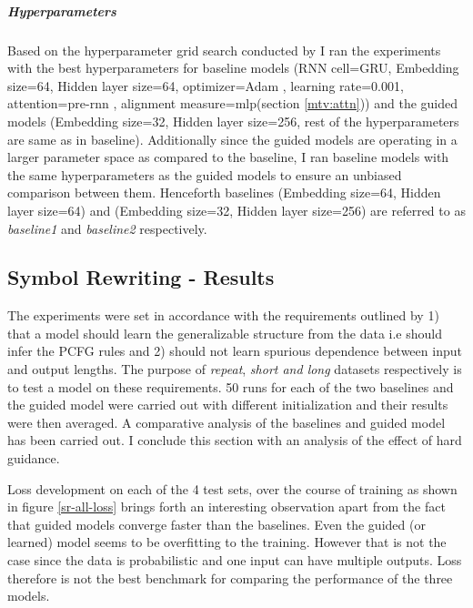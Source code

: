 \subparagraph{Hyperparameters} Based on the hyperparameter grid search conducted by \cite{Hupkes2018} I ran the experiments with the best hyperparameters for baseline models (RNN cell=GRU, Embedding size=64, Hidden layer size=64, optimizer=Adam \citep{KingmaB14}, learning rate=0.001, attention=pre-rnn \citep{Bahdanau2014}, alignment measure=mlp(section \ref{mtv:attn})) and the guided models (Embedding size=32, Hidden layer size=256, rest of the hyperparameters are same as in baseline). Additionally since the guided models are operating in a larger parameter space as compared to the baseline, I ran baseline models with the same hyperparameters as the guided models to ensure an unbiased comparison between them. Henceforth baselines (Embedding size=64, Hidden layer size=64) and (Embedding size=32, Hidden layer size=256) are referred to as \textit{baseline1} and \textit{baseline2} respectively.

\subsection{Symbol Rewriting - Results}
The experiments were set in accordance with the requirements outlined by \cite{Weber2018} 1) that a model should learn the generalizable structure from the data i.e should infer the PCFG rules and 2) should not learn spurious dependence between input and output lengths. The purpose of \textit{repeat}, \textit{short and long} datasets respectively is to test a model on these requirements. 50 runs for each of the two baselines and the guided model were carried out with different initialization and their results were then averaged. A comparative analysis of the baselines and guided model has been carried out. I conclude this section with an analysis of the effect of hard guidance.

Loss development on each of the 4 test sets, over the course of training as shown in figure \ref{sr-all-loss} brings forth an interesting observation apart from the fact that guided models converge faster than the baselines. Even the guided (or learned) model seems to be overfitting to the training. However that is not the case since the data is probabilistic and one input can have multiple outputs. Loss therefore is not the best benchmark for comparing the performance of the three models.

